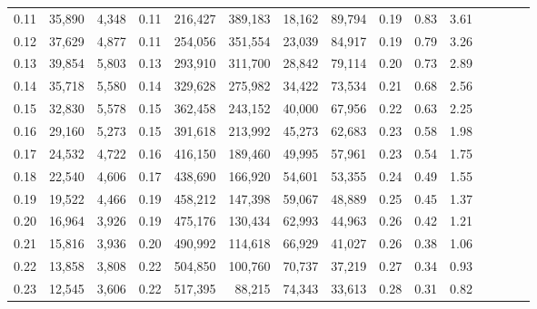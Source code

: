 \begin{tabular}{rrrcrrrrrrrrrrr}
0.11 &  35,890 &  4,348 &                                       0.11 &  216,427 &  389,183 &   18,162 &   89,794 &  0.19 &  0.83 &                         3.61 \\
0.12 &  37,629 &  4,877 &                                       0.11 &  254,056 &  351,554 &   23,039 &   84,917 &  0.19 &  0.79 &                         3.26 \\
0.13 &  39,854 &  5,803 &                                       0.13 &  293,910 &  311,700 &   28,842 &   79,114 &  0.20 &  0.73 &                         2.89 \\
0.14 &  35,718 &  5,580 &                                       0.14 &  329,628 &  275,982 &   34,422 &   73,534 &  0.21 &  0.68 &                         2.56 \\
0.15 &  32,830 &  5,578 &                                       0.15 &  362,458 &  243,152 &   40,000 &   67,956 &  0.22 &  0.63 &                         2.25 \\
0.16 &  29,160 &  5,273 &                                       0.15 &  391,618 &  213,992 &   45,273 &   62,683 &  0.23 &  0.58 &                         1.98 \\
0.17 &  24,532 &  4,722 &                                       0.16 &  416,150 &  189,460 &   49,995 &   57,961 &  0.23 &  0.54 &                         1.75 \\
0.18 &  22,540 &  4,606 &                                       0.17 &  438,690 &  166,920 &   54,601 &   53,355 &  0.24 &  0.49 &                         1.55 \\
0.19 &  19,522 &  4,466 &                                       0.19 &  458,212 &  147,398 &   59,067 &   48,889 &  0.25 &  0.45 &                         1.37 \\
0.20 &  16,964 &  3,926 &                                       0.19 &  475,176 &  130,434 &   62,993 &   44,963 &  0.26 &  0.42 &                         1.21 \\
0.21 &  15,816 &  3,936 &                                       0.20 &  490,992 &  114,618 &   66,929 &   41,027 &  0.26 &  0.38 &                         1.06 \\
0.22 &  13,858 &  3,808 &                                       0.22 &  504,850 &  100,760 &   70,737 &   37,219 &  0.27 &  0.34 &                         0.93 \\
0.23 &  12,545 &  3,606 &                                       0.22 &  517,395 &   88,215 &   74,343 &   33,613 &  0.28 &  0.31 &                         0.82 \\

\end{tabular}
